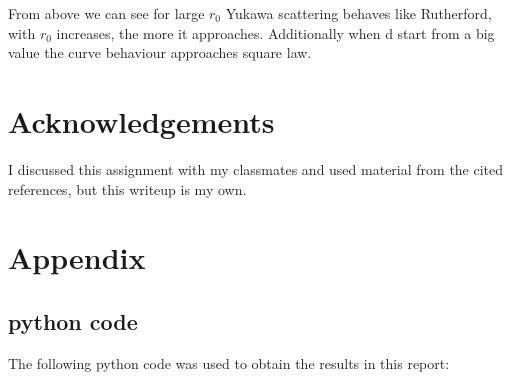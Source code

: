 \documentclass[11pt,letterpaper]{article}
\begin{document}
From above we can see for large $r_0$ Yukawa scattering behaves like Rutherford, with $r_0$ increases, the more it approaches. Additionally when d start from a big value the curve behaviour approaches square law. 



\newpage
\section*{Acknowledgements}

I discussed this assignment with my classmates and used material from the
cited references, but this writeup is my own.



\newpage
\appendix
\section{Appendix}

\subsection{python code}

The following python code was used to obtain the results in this report:






\end{document}
